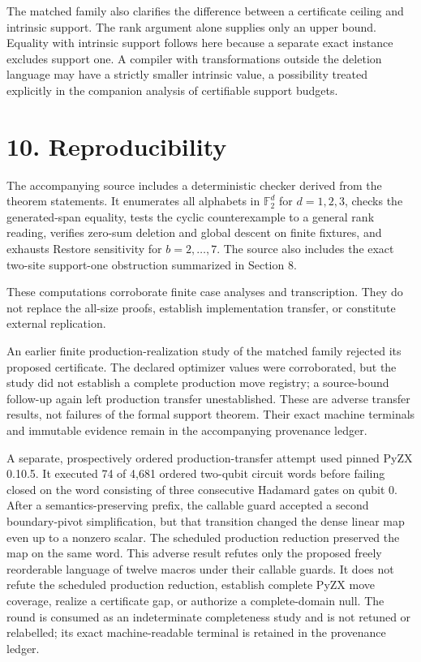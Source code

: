 \documentclass[11pt]{article}
\begin{document}
The matched family also clarifies the difference between a certificate ceiling and intrinsic support. The rank argument alone supplies only an upper bound. Equality with intrinsic support follows here because a separate exact instance excludes support one. A compiler with transformations outside the deletion language may have a strictly smaller intrinsic value, a possibility treated explicitly in the companion analysis of certifiable support budgets.

\hypertarget{reproducibility}{%
\section*{10. Reproducibility}\label{reproducibility}}

The accompanying source includes a deterministic checker derived from the theorem statements. It enumerates all alphabets in \(\mathbb{F}_2^d\) for \(d=1,2,3\), checks the generated-span equality, tests the cyclic counterexample to a general rank reading, verifies zero-sum deletion and global descent on finite fixtures, and exhausts Restore sensitivity for \(b=2,\ldots,7\). The source also includes the exact two-site support-one obstruction summarized in Section 8.

These computations corroborate finite case analyses and transcription. They do not replace the all-size proofs, establish implementation transfer, or constitute external replication.

An earlier finite production-realization study of the matched family rejected its proposed certificate. The declared optimizer values were corroborated, but the study did not establish a complete production move registry; a source-bound follow-up again left production transfer unestablished. These are adverse transfer results, not failures of the formal support theorem. Their exact machine terminals and immutable evidence remain in the accompanying provenance ledger.

A separate, prospectively ordered production-transfer attempt used pinned PyZX 0.10.5. It executed 74 of 4,681 ordered two-qubit circuit words before failing closed on the word consisting of three consecutive Hadamard gates on qubit 0. After a semantics-preserving prefix, the callable guard accepted a second boundary-pivot simplification, but that transition changed the dense linear map even up to a nonzero scalar. The scheduled production reduction preserved the map on the same word. This adverse result refutes only the proposed freely reorderable language of twelve macros under their callable guards. It does not refute the scheduled production reduction, establish complete PyZX move coverage, realize a certificate gap, or authorize a complete-domain null. The round is consumed as an indeterminate completeness study and is not retuned or relabelled; its exact machine-readable terminal is retained in the provenance ledger.
\end{document}
